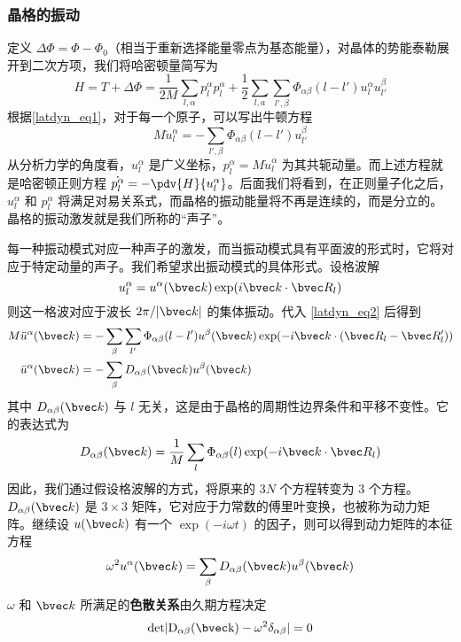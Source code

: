 \subsubsection{晶格的振动}
定义 $\Delta \Phi=\Phi-\Phi_0$（相当于重新选择能量零点为基态能量），对晶体的势能泰勒展开到二次方项，我们将哈密顿量简写为
\begin{equation}
H=T+\Delta \Phi=\frac{1}{2M}\sum_{l,\alpha}p_l^\alpha p_l^\alpha + \frac{1}{2}\sum_{l,a}\sum_{l',\beta}\Phi_{\alpha\beta}(l-l')u_l^\alpha u_{l'}^\beta
\end{equation}
根据\autoref{latdyn_eq1}，对于每一个原子，可以写出牛顿方程
\begin{equation}\label{latdyn_eq2}
M \ddot{u}_l^\alpha = -\sum_{l',\beta}\Phi_{\alpha\beta}(l-l')u_{l'}^\beta
\end{equation}
从分析力学的角度看，$u_l^\alpha$ 是广义坐标，$p_l^\alpha=M\dot{u}_l^\alpha$ 为其共轭动量。而上述方程就是哈密顿正则方程 $\dot{p_l^\alpha}=-\pdv{H}{u_l^\alpha}$。后面我们将看到，在正则量子化之后，$u_l^\alpha$ 和 $p_l^\alpha$ 将满足对易关系式，而晶格的振动能量将不再是连续的，而是分立的。晶格的振动激发就是我们所称的“声子”。

每一种振动模式对应一种声子的激发，而当振动模式具有平面波的形式时，它将对应于特定动量的声子。我们希望求出振动模式的具体形式。设格波解
\begin{equation}
u_l^\alpha = u^\alpha(\bvec k) \exp(i\bvec k\cdot \bvec R_l)
\end{equation}
则这一格波对应于波长 $2\pi/|\bvec k|$ 的集体振动。代入 \autoref{latdyn_eq2} 后得到
\begin{equation}
\begin{aligned}
M\ddot{u}^\alpha(\bvec k)&=-\sum_{\beta}\sum_{l'}\Phi_{\alpha\beta}(l-l')u^\beta(\bvec k)\exp(-i\bvec k\cdot(\bvec R_l-\bvec R_l'))\\
\ddot{u}^\alpha(\bvec k)&=-\sum_{\beta}D_{\alpha\beta}(\bvec k)u^\beta(\bvec k)
\end{aligned}
\end{equation}
其中 $D_{\alpha\beta}(\bvec k)$ 与 $l$ 无关，这是由于晶格的周期性边界条件和平移不变性。它的表达式为
\begin{equation}
D_{\alpha\beta}(\bvec k)=\frac{1}{M}\sum_l \Phi_{\alpha\beta}(l)\exp(-i\bvec k\cdot \bvec R_l)
\end{equation}
因此，我们通过假设格波解的方式，将原来的 $3N$ 个方程转变为 $3$ 个方程。$D_{\alpha\beta}(\bvec k)$ 是 $3\times 3$ 矩阵，它对应于力常数的傅里叶变换，也被称为动力矩阵。继续设 $u(\bvec k)$ 有一个 $\exp(-i\omega t)$ 的因子，则可以得到动力矩阵的本征方程
\begin{equation}
\omega^2 u^\alpha(\bvec k)=\sum_{\beta}D_{\alpha\beta}(\bvec k)u^\beta(\bvec k)
\end{equation}
$\omega$ 和 $\bvec k$ 所满足的\textbf{色散关系}由久期方程决定
\begin{equation}
\rm{det} |D_{\alpha\beta}(\bvec k)-\omega^2\delta_{\alpha\beta}|=0
\end{equation}


